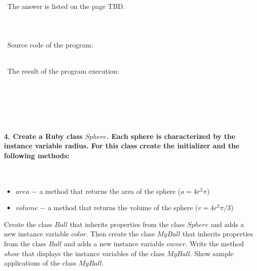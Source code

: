 \documentclass{article}
\begin{document}
\paragraph{}\
	The answer is listed on the page TBD.
\paragraph{}\
\paragraph{}\
Source code of the program:

\begin{verbatim}

\end{verbatim}

\paragraph{}\
	The result of the program execution:
	
\begin{verbatim} 

\end{verbatim}


\paragraph{}\
\paragraph{}\



\paragraph{4. Create a Ruby class \(Sphere\). Each sphere is characterized by the instance variable radius. For this class create the initializer and the following methods: }\

	\begin{itemize}
		\item \(area\) \(-\) a method that returns the area of the sphere (\(a = 4r^2\pi\))
		\item \(volume\) \(-\) a method that returns the volume of the sphere (\(v = 4r^3\pi / 3\))
	\end{itemize}
	
	Create the class \(Ball\) that inherits properties from the class \(Sphere\) and adds a new instance variable \(color\). Then create the class \(MyBall\) that inherits properties from the class \(Ball\) and adds a new instance variable \(owner\). Write the method \(show\) that displays the instance variables of the class \(MyBall\). Show sample applications of the class \(MyBall\).
\end{document}
